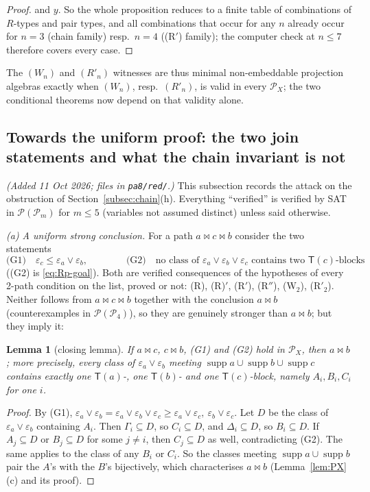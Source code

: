 \documentclass[11pt]{amsart}
\newtheorem{lemma}[theorem]{Lemma}
\theoremstyle{definition}
\renewcommand{\P}{\mathcal{P}}
\newcommand{\supp}{\operatorname{supp}}
\newcommand{\T}{\mathsf{T}}
\newcommand{\mt}{\bowtie}   %
\begin{document}
\begin{proof}
and $y$. So the whole proposition reduces to a finite table of combinations of $R$-types and pair types, and all combinations that occur for any $n$ already occur for $n=3$ (chain family) resp.\ $n=4$ ((R$'$) family); the computer check at $n\le7$ therefore covers every case.
\end{proof}

The $(W_n)$ and $(R'_n)$ witnesses are thus minimal non-embeddable projection algebras exactly when $(W_n)$, resp.\ $(R'_n)$, is valid in every $\P_X$; the two conditional theorems now depend on that validity alone.

\subsection{Towards the uniform proof: the two join statements and what the chain invariant is not}\label{subsec:joinstat}

\emph{(Added 11 Oct 2026; files in \texttt{pa8/red/}.)} This subsection records the attack on the obstruction of Section~\ref{subsec:chain}(h). Everything ``verified'' is verified by SAT in $\P(\P_m)$ for $m\le5$ (variables not assumed distinct) unless said otherwise.

\emph{(a) A uniform strong conclusion.} For a path $a\mt c\mt b$ consider the two statements
\[
\text{(G1)}\quad \varepsilon_c\le\varepsilon_a\vee\varepsilon_b,\qquad\qquad \text{(G2)}\quad\text{no class of }\varepsilon_a\vee\varepsilon_b\vee\varepsilon_c\text{ contains two }\T(c)\text{-blocks}
\]
((G2) is \eqref{eq:Rp-goal}). Both are verified consequences of the hypotheses of every 2-path condition on the list, proved or not: (R), (R)$'$, (R$'$), (R$''$), (W$_2$), (R$'_2$). Neither follows from $a\mt c\mt b$ together with the conclusion $a\mt b$ (counterexamples in $\P(\P_4)$), so they are genuinely stronger than $a\mt b$; but they imply it:

\begin{lemma}[closing lemma]\label{lem:closing}
If $a\mt c$, $c\mt b$, \textup{(G1)} and \textup{(G2)} hold in $\P_X$, then $a\mt b$; more precisely, every class of $\varepsilon_a\vee\varepsilon_b$ meeting $\supp a\cup\supp b\cup\supp c$ contains exactly one $\T(a)$-, one $\T(b)$- and one $\T(c)$-block, namely $A_i,B_i,C_i$ for one $i$.
\end{lemma}

\begin{proof}
By (G1), $\varepsilon_a\vee\varepsilon_b=\varepsilon_a\vee\varepsilon_b\vee\varepsilon_c\ge\varepsilon_a\vee\varepsilon_c,\ \varepsilon_b\vee\varepsilon_c$. Let $D$ be the class of $\varepsilon_a\vee\varepsilon_b$ containing $A_i$. Then $\Gamma_i\subseteq D$, so $C_i\subseteq D$, and $\Delta_i\subseteq D$, so $B_i\subseteq D$. If $A_j\subseteq D$ or $B_j\subseteq D$ for some $j\ne i$, then $C_j\subseteq D$ as well, contradicting (G2). The same applies to the class of any $B_i$ or $C_i$. So the classes meeting $\supp a\cup\supp b$ pair the $A$'s with the $B$'s bijectively, which characterises $a\mt b$ (Lemma~\ref{lem:PX}(c) and its proof).
\end{proof}
\end{document}
